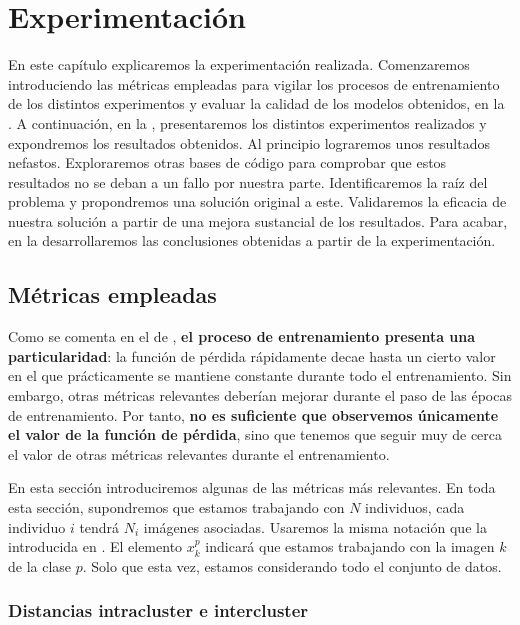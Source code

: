\chapter{Experimentación} \label{ich:Experimentación}

En este capítulo explicaremos la experimentación realizada. Comenzaremos introduciendo las métricas empleadas para vigilar los procesos de entrenamiento de los distintos experimentos y evaluar la calidad de los modelos obtenidos, en la . A continuación, en la , presentaremos los distintos experimentos realizados y expondremos los resultados obtenidos. Al principio lograremos unos resultados nefastos. Exploraremos otras bases de código para comprobar que estos resultados no se deban a un fallo por nuestra parte. Identificaremos la raíz del problema y propondremos una solución original a este. Validaremos la eficacia de nuestra solución a partir de una mejora sustancial de los resultados. Para acabar, en la  desarrollaremos las conclusiones obtenidas a partir de la experimentación.

\section{Métricas empleadas} \label{isec:metricas_teoria}

Como se comenta en el  de \cite{informatica:principal}, \textbf{el proceso de entrenamiento presenta una particularidad}: la función de pérdida rápidamente decae hasta un cierto valor en el que prácticamente se mantiene constante durante todo el entrenamiento. Sin embargo, otras métricas relevantes deberían mejorar durante el paso de las épocas de entrenamiento. Por tanto, \textbf{no es suficiente que observemos únicamente el valor de la función de pérdida}, sino que tenemos que seguir muy de cerca el valor de otras métricas relevantes durante el entrenamiento.

En esta sección introduciremos algunas de las métricas más relevantes. En toda esta sección, supondremos que estamos trabajando con $N$ individuos, cada individuo $i$ tendrá $N_i$ imágenes asociadas. Usaremos la misma notación que la introducida en . El elemento $x_k^p$ indicará que estamos trabajando con la imagen $k$ de la clase $p$. Solo que esta vez, estamos considerando todo el conjunto de datos.


\subsection{Distancias intracluster e intercluster} \label{isubs:teoria_distancia_intra_inter_cluster}


